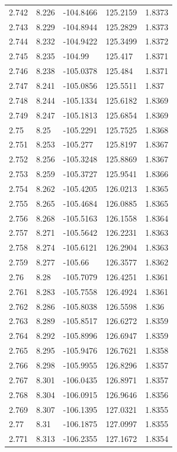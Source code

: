\begin{tabular}{lllll}
2.742 & 8.226 & -104.8466 & 125.2159 & 1.8373 \\
2.743 & 8.229 & -104.8944 & 125.2829 & 1.8373 \\
2.744 & 8.232 & -104.9422 & 125.3499 & 1.8372 \\
2.745 & 8.235 & -104.99 & 125.417 & 1.8371 \\
2.746 & 8.238 & -105.0378 & 125.484 & 1.8371 \\
2.747 & 8.241 & -105.0856 & 125.5511 & 1.837 \\
2.748 & 8.244 & -105.1334 & 125.6182 & 1.8369 \\
2.749 & 8.247 & -105.1813 & 125.6854 & 1.8369 \\
2.75 & 8.25 & -105.2291 & 125.7525 & 1.8368 \\
2.751 & 8.253 & -105.277 & 125.8197 & 1.8367 \\
2.752 & 8.256 & -105.3248 & 125.8869 & 1.8367 \\
2.753 & 8.259 & -105.3727 & 125.9541 & 1.8366 \\
2.754 & 8.262 & -105.4205 & 126.0213 & 1.8365 \\
2.755 & 8.265 & -105.4684 & 126.0885 & 1.8365 \\
2.756 & 8.268 & -105.5163 & 126.1558 & 1.8364 \\
2.757 & 8.271 & -105.5642 & 126.2231 & 1.8363 \\
2.758 & 8.274 & -105.6121 & 126.2904 & 1.8363 \\
2.759 & 8.277 & -105.66 & 126.3577 & 1.8362 \\
2.76 & 8.28 & -105.7079 & 126.4251 & 1.8361 \\
2.761 & 8.283 & -105.7558 & 126.4924 & 1.8361 \\
2.762 & 8.286 & -105.8038 & 126.5598 & 1.836 \\
2.763 & 8.289 & -105.8517 & 126.6272 & 1.8359 \\
2.764 & 8.292 & -105.8996 & 126.6947 & 1.8359 \\
2.765 & 8.295 & -105.9476 & 126.7621 & 1.8358 \\
2.766 & 8.298 & -105.9955 & 126.8296 & 1.8357 \\
2.767 & 8.301 & -106.0435 & 126.8971 & 1.8357 \\
2.768 & 8.304 & -106.0915 & 126.9646 & 1.8356 \\
2.769 & 8.307 & -106.1395 & 127.0321 & 1.8355 \\
2.77 & 8.31 & -106.1875 & 127.0997 & 1.8355 \\
2.771 & 8.313 & -106.2355 & 127.1672 & 1.8354 \\

\end{tabular}

